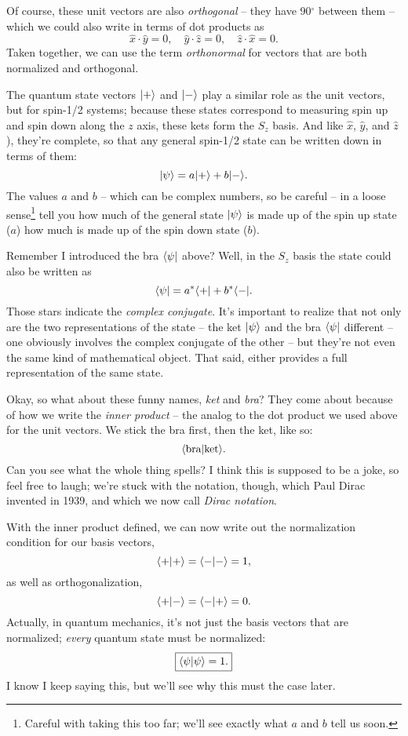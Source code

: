 Of course, these unit vectors are also \emph{orthogonal} -- they have 90$^\circ$ between them -- which we could also write in terms of dot products as
\[
\hat{x} \cdot \hat{y} = 0, \quad \hat{y} \cdot \hat{z} = 0, \quad \hat{z} \cdot \hat{x} = 0.
\]
Taken together, we can use the term \emph{orthonormal} for vectors that are both normalized and orthogonal.

The quantum state vectors $| + \rangle$ and $| - \rangle$ play a similar role as the unit vectors, but for spin-1/2 systems; because these states correspond to measuring spin up and spin down along the $z$ axis, these kets form the $S_z$ basis.  And like $\hat{x}$, $\hat{y}$, and $\hat{z}$), they're complete, so that any general spin-1/2 state can be written down in terms of them:
\begin{equation}
| \psi \rangle = a | + \rangle + b| - \rangle.
\end{equation}
The values $a$ and $b$ -- which can be complex numbers, so be careful -- in a loose sense\footnote{Careful with taking this too far; we'll see exactly what $a$ and $b$ tell us soon.} tell you how much of the general state $| \psi \rangle$ is made up of the spin up state ($a$) how much is made up of the spin down state ($b$).

Remember I introduced the bra $\langle \psi |$ above?  Well, in the $S_z$ basis the state could also be written as
\begin{equation}
\langle \psi | = a^* \langle + | + b^* \langle - |.
\end{equation}
Those stars indicate the \emph{complex conjugate}.  It's important to realize that not only are the two representations of the state -- the ket $| \psi \rangle$ and the bra $\langle \psi |$ different -- one obviously involves the complex conjugate of the other -- but they're not even the same kind of mathematical object.  That said, either provides a full representation of the same state.

Okay, so what about these funny names, \emph{ket} and \emph{bra}?  They come about because of how we write the \emph{inner product} -- the analog to the dot product we used above for the unit vectors.  We stick the bra first, then the ket, like so:
\[
\langle \text{bra} | \text{ket} \rangle.
\]
Can you see what the whole thing spells?  I think this is supposed to be a joke, so feel free to laugh; we're stuck with the notation, though, which Paul Dirac invented in 1939, and which we now call \emph{Dirac notation}. 

With the inner product defined, we can now write out the normalization condition for our basis vectors,
\begin{equation}
\langle + | + \rangle = \langle - | - \rangle = 1,
\end{equation}
as well as orthogonalization,
\begin{equation}
\langle + | - \rangle = \langle - | + \rangle = 0.
\end{equation}
Actually, in quantum mechanics, it's not just the basis vectors that are normalized; \emph{every} quantum state must be normalized:
\begin{equation}
\boxed{
\langle \psi | \psi \rangle = 1.
}\end{equation}
I know I keep saying this, but we'll see why this must the case later.

